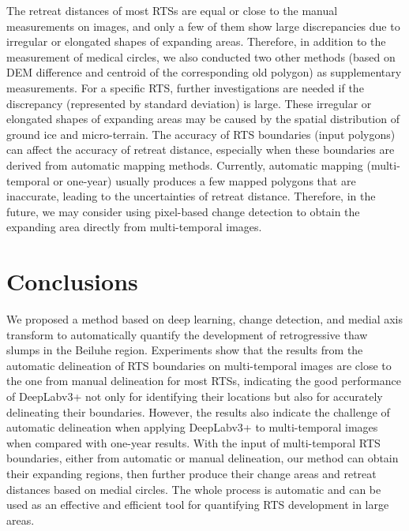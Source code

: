 \documentclass[authoryear,preprint,review,12pt]{elsarticle}
\begin{document}
The retreat distances of most RTSs are equal or close to the manual measurements on images, and only a few of them show large discrepancies due to irregular or elongated shapes of expanding areas. 
Therefore, in addition to the measurement of medical circles, we also conducted two other methods (based on DEM difference and centroid of the corresponding old polygon) as supplementary measurements. 
For a specific RTS, further investigations are needed if the discrepancy (represented by standard deviation) is large. 
These irregular or elongated shapes of expanding areas may be caused by the spatial distribution of ground ice and micro-terrain.
The accuracy of RTS boundaries (input polygons) can affect the accuracy of retreat distance, especially when these boundaries are derived from automatic mapping methods. 
Currently, automatic mapping (multi-temporal or one-year) usually produces a few mapped polygons that are inaccurate, leading to the uncertainties of retreat distance. 
Therefore, in the future, we may consider using pixel-based change detection to obtain the expanding area directly from multi-temporal images. 



%


\section{Conclusions}
\label{sec_conclusion}

We proposed a method based on deep learning, change detection, and medial axis transform to automatically quantify the development of retrogressive thaw slumps in the Beiluhe region. 
Experiments show that the results from the automatic delineation of RTS boundaries on multi-temporal images are close to the one from manual delineation for most RTSs, indicating the good performance of DeepLabv3+ not only for identifying their locations but also for accurately delineating their boundaries. 
However, the results also indicate the challenge of automatic delineation when applying DeepLabv3+ to multi-temporal images when compared with one-year results. 
With the input of multi-temporal RTS boundaries, either from automatic or manual delineation, our method can obtain their expanding regions, then further produce their change areas and retreat distances based on medial circles. 
The whole process is automatic and can be used as an effective and efficient tool for quantifying RTS development in large areas. 
\end{document}
